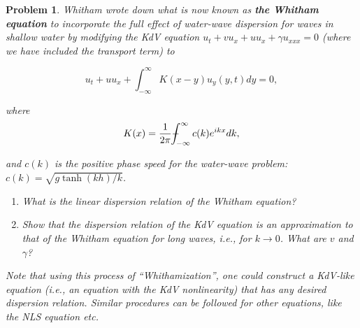 \documentclass[12pt]{report}
\def\Xint#1{\mathchoice
   {\XXint\displaystyle\textstyle{#1}}%
   {\XXint\textstyle\scriptstyle{#1}}%
   {\XXint\scriptstyle\scriptscriptstyle{#1}}%
   {\XXint\scriptscriptstyle\scriptscriptstyle{#1}}%
   \!\int}
\def\XXint#1#2#3{{\setbox0=\hbox{$#1{#2#3}{\int}$}
     \vcenter{\hbox{$#2#3$}}\kern-.5\wd0}}
\def\dashint{\Xint-}
\newtheorem{problem}{Problem}
\def\dashint{\Xint-}
\begin{document}
\begin{problem}
    Whitham wrote down what is now known as {\bf the Whitham equation} to incorporate the full effect of water-wave dispersion for waves in shallow water by modifying the KdV equation $u_t+vu_x+u u_x+\gamma u_{xxx}=0$ (where we have included the transport term) to

    \[
    u_t+uu_x+\int_{-\infty}^\infty K(x-y)u_y(y,t)dy=0,
    \]

    where
    \[
    K(x)=\frac{1}{2\pi}\dashint_{-\infty}^\infty c(k)e^{ikx}dk,
    \]

    and $c(k)$ is the positive phase speed for the water-wave problem: $c(k)=\sqrt{g\tanh(kh)/k}$.

    \begin{enumerate}

    \item What is the linear dispersion relation of the Whitham equation?

    \item Show that the dispersion relation of the KdV equation is an approximation to that of the Whitham equation for long waves, {\em i.e.}, for $k \rightarrow 0$. What are $v$ and $\gamma$?

    \end{enumerate}

    Note that using this process of ``Whithamization'', one could construct a KdV-like equation ({\em i.e.}, an equation with the KdV nonlinearity) that has any desired dispersion relation. Similar procedures can be followed for other equations, like the NLS equation {\em etc}.

\end{problem}
\end{document}
